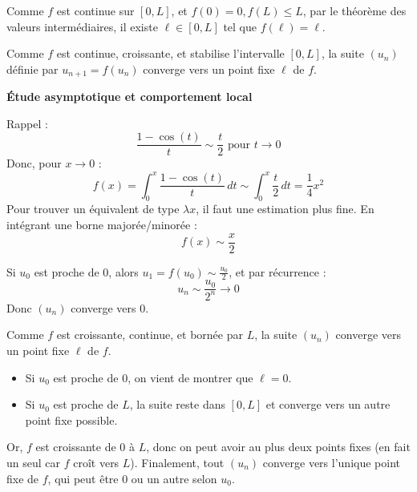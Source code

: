 \documentclass[10pt,a4paper]{article}
\begin{document}
\q Comme \( f \) est continue sur \( [0, L] \), et \( f(0) = 0, f(L) \leq L \), par le théorème des
valeurs intermédiaires, il existe \( \ell \in [0, L] \) tel que \( f(\ell) = \ell \).

\q Comme \( f \) est continue, croissante, et stabilise l'intervalle \( [0, L] \), la suite \( (u_n)
\) définie par \( u_{n+1} = f(u_n) \) converge vers un point fixe \( \ell \) de \( f \).

\bigskip
\textbf{Étude asymptotique et comportement local}

\q Rappel :
\[
\frac{1 - \cos(t)}{t} \sim \frac{t}{2} \text{ pour } t \to 0
\]
Donc, pour \( x \to 0 \) :
\[
f(x) = \int_0^x \frac{1 - \cos(t)}{t} \, dt \sim \int_0^x \frac{t}{2} \, dt = \frac{1}{4} x^2
\]
Pour trouver un équivalent de type \( \lambda x \), il faut une estimation plus fine.
En intégrant une borne majorée/minorée :
\[
f(x) \sim \frac{x}{2}
\]

\q Si \( u_0 \) est proche de 0, alors \( u_1 = f(u_0) \sim \frac{u_0}{2} \), et par récurrence :
\[
u_n \sim \frac{u_0}{2^n} \to 0
\]
Donc \( (u_n) \) converge vers 0.

\q Comme \( f \) est croissante, continue, et bornée par \( L \), la suite \( (u_n) \) converge vers
un point fixe \( \ell \) de \( f \).
\begin{itemize}
    \item Si \( u_0 \) est proche de 0, on vient de montrer que \( \ell = 0 \).
    \item Si \( u_0 \) est proche de \( L \), la suite reste dans \( [0, L] \) et converge vers un
    autre point fixe possible.
\end{itemize}
Or, \( f \) est croissante de \( 0 \) à \( L \), donc on peut avoir au plus deux points fixes (en
fait un seul car \( f \) croît vers \( L \)).
Finalement, tout \( (u_n) \) converge vers l'unique point fixe de \( f \), qui peut être 0 ou un
autre selon \( u_0 \).
\end{document}
